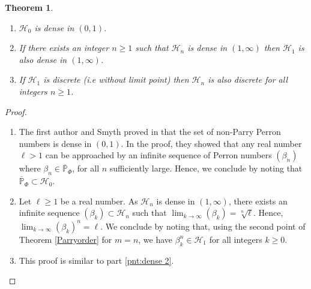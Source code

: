 \documentclass[12pt]{article}
\theoremstyle{plain}
\newtheorem{theorem}{Theorem}[section]
\theoremstyle{remark}
\begin{document}
\begin{theorem}{\ }
 \begin{enumerate}
 \item $\mathcal{H}_0$ is dense in $(0,1)$.
 \item If there exists an integer $n\geq 1$ such that $\mathcal{H}_n $ is dense in $(1,\infty)$ then $\mathcal{H}_1 $ is also dense in $(1,\infty)$. \label{pnt:dense 2}
 \item If $\mathcal{H}_1$ is discrete (i.e without limit point) then $\mathcal{H}_n$ is also discrete for all integers $n\geq 1$.
\end{enumerate}
\end{theorem}

\begin{proof}{\ }
 \begin{enumerate}
 \item The first author and Smyth proved in \cite{HichriSmyth2024} that the set of non-Parry Perron numbers is dense in $(0,1)$. In the proof, they showed that any real number $\ell>1$ can be approached by an infinite sequence of Perron numbers $(\beta_n)$ where $\beta_n \in \overline{\mathbb{P}}_\Phi$, for all $n$ sufficiently large. Hence, we conclude by noting that $\overline{\mathbb{P}}_\Phi \subset \mathcal{H}_0$.
\item Let $\ell \geq 1 $ be a real number. As $\mathcal{H}_n$ is dense in $(1,\infty)$, there exists an infinite sequence $(\beta_k) \subset \mathcal{H}_n$ such that $\lim_{k\to\infty}(\beta_k)= \sqrt[n]{\ell} $. Hence, $\lim_{k\to\infty}(\beta_k)^n= \ell $. We conclude by noting that, using the second point of Theorem \ref{Parryorder} for $m=n$, we have $\beta_k^n\in \mathcal{H}_1$ for all integers $k \geq 0$.
 \item This proof is similar to part \ref{pnt:dense 2}.
 \end{enumerate}
\end{proof}
 
\end{document}
